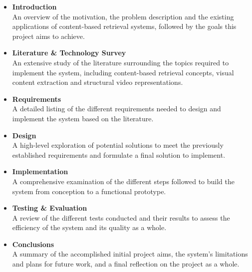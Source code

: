 \begin{itemize}
    \item \textbf{Introduction}\\
    An overview of the motivation, the problem description and the existing applications of content-based retrieval systems, followed by the goals this project aims to achieve.
    \item \textbf{Literature \& Technology Survey}\\
    An extensive study of the literature surrounding the topics required to implement the system, including content-based retrieval concepts, visual content extraction and structural video representations.
    \item \textbf{Requirements}\\
    A detailed listing of the different requirements needed to design and implement the system based on the literature.
    \item \textbf{Design}\\
    A high-level exploration of potential solutions to meet the previously established requirements and formulate a final solution to implement.
    \item \textbf{Implementation}\\
    A comprehensive examination of the different steps followed to build the system from conception to a functional prototype.
    \item \textbf{Testing \& Evaluation}\\
    A review of the different tests conducted and their results to assess the efficiency of the system and its quality as a whole.
    \item \textbf{Conclusions}\\
    A summary of the accomplished initial project aims, the system's limitations and plans for future work, and a final reflection on the project as a whole.
\end{itemize}